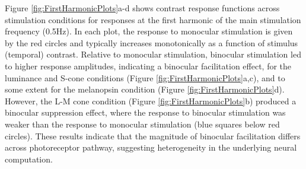 \documentclass[
]{article}
\begin{document}
Figure \ref{fig:FirstHarmonicPlots}a-d shows contrast response functions across stimulation conditions for responses at the first harmonic of the main stimulation frequency (0.5Hz). In each plot, the response to monocular stimulation is given by the red circles and typically increases monotonically as a function of stimulus (temporal) contrast. Relative to monocular stimulation, binocular stimulation led to higher response amplitudes, indicating a binocular facilitation effect, for the luminance and S-cone conditions (Figure \ref{fig:FirstHarmonicPlots}a,c), and to some extent for the melanopsin condition (Figure \ref{fig:FirstHarmonicPlots}d). However, the L-M cone condition (Figure \ref{fig:FirstHarmonicPlots}b) produced a binocular suppression effect, where the response to binocular stimulation was weaker than the response to monocular stimulation (blue squares below red circles). These results indicate that the magnitude of binocular facilitation differs across photoreceptor pathway, suggesting heterogeneity in the underlying neural computation.
\end{document}
